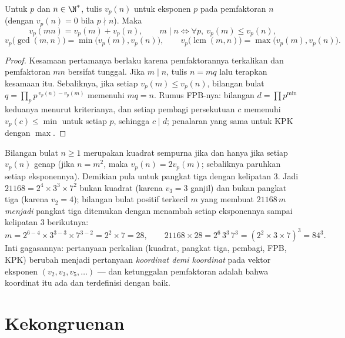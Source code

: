 \begin{proposition}[Valuasi]\label{prop:b1:arith:valuation}
Untuk $p$  dan $n \in \N^*$, tulis $v_p(n)$ untuk eksponen $p$ pada
pemfaktoran $n$ (dengan $v_p(n) = 0$ bila $p \nmid n$). Maka
\[
v_p(mn) = v_p(m) + v_p(n),
\qquad
m \mid n \iff \forall p,\ v_p(m) \leq v_p(n),
\]
\[
v_p\bigl(\gcd(m,n)\bigr) = \min\bigl(v_p(m), v_p(n)\bigr),
\qquad
v_p\bigl(\operatorname{lcm}(m,n)\bigr) = \max\bigl(v_p(m),
v_p(n)\bigr).
\]
\end{proposition}

\begin{proof}
Kesamaan pertamanya berlaku karena pemfaktorannya terkalikan dan
pemfaktoran $mn$ bersifat tunggal. Jika $m \mid n$, tulis $n = mq$ lalu
terapkan kesamaan itu. Sebaliknya, jika setiap $v_p(m) \leq v_p(n)$, bilangan bulat $q =
\prod_p p^{\,v_p(n) - v_p(m)}$ memenuhi $mq = n$. Rumus FPB-nya:
bilangan $d = \prod p^{\min}$  keduanya menurut kriterianya, dan
setiap pembagi persekutuan $c$ memenuhi $v_p(c) \leq \min$ untuk setiap $p$, sehingga $c
\mid d$; penalaran yang sama untuk KPK dengan $\max$.
\end{proof}

\begin{example}\label{ex:b1:arith:squarecube}
Bilangan bulat $n \geq 1$ merupakan kuadrat sempurna jika dan hanya jika setiap
$v_p(n)$ genap (jika $n = m^2$, maka $v_p(n) = 2v_p(m)$;
sebaliknya paruhkan setiap eksponennya). Demikian pula untuk pangkat tiga dengan
kelipatan $3$. Jadi $21168 = 2^4 \times 3^3 \times 7^2$ bukan
kuadrat (karena $v_3 = 3$ ganjil) dan bukan pangkat tiga (karena $v_2 = 4$);
bilangan bulat positif terkecil $m$ yang membuat $21168\,m$ \emph{menjadi}
pangkat tiga ditemukan dengan menambah setiap eksponennya sampai kelipatan
$3$ berikutnya:
\[
m = 2^{6-4} \times 3^{3-3} \times 7^{3-2} = 2^2 \times 7 = 28,
\qquad
21168 \times 28 = 2^6\,3^3\,7^3 = (2^2 \times 3 \times 7)^3
= 84^3 .
\]
Inti gagasannya: pertanyaan perkalian (kuadrat, pangkat tiga, pembagi,
FPB, KPK) berubah menjadi pertanyaan \emph{koordinat demi koordinat} pada vektor
eksponen $(v_2, v_3, v_5, \dots)$ --- dan ketunggalan pemfaktoran adalah
 bahwa koordinat itu ada dan terdefinisi dengan baik.
\end{example}

\section{Kekongruenan}

